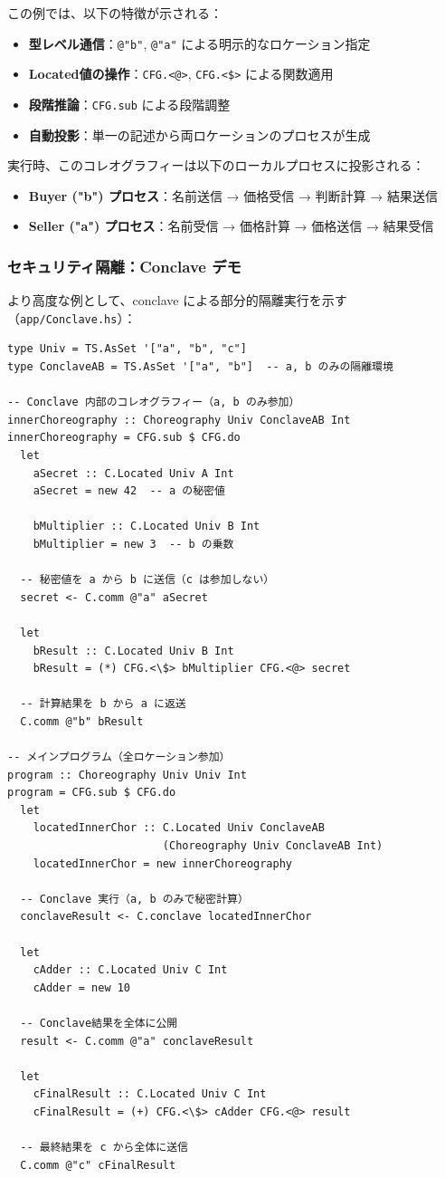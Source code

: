 この例では、以下の特徴が示される：
\begin{itemize}
\item \textbf{型レベル通信}：\texttt{@"b"}, \texttt{@"a"} による明示的なロケーション指定
\item \textbf{Located値の操作}：\texttt{CFG.<@>}, \texttt{CFG.<\$>} による関数適用
\item \textbf{段階推論}：\texttt{CFG.sub} による段階調整
\item \textbf{自動投影}：単一の記述から両ロケーションのプロセスが生成
\end{itemize}

実行時、このコレオグラフィーは以下のローカルプロセスに投影される：
\begin{itemize}
\item \textbf{Buyer ("b") プロセス}：名前送信 → 価格受信 → 判断計算 → 結果送信
\item \textbf{Seller ("a") プロセス}：名前受信 → 価格計算 → 価格送信 → 結果受信
\end{itemize}

\subsubsection{セキュリティ隔離：Conclave デモ}

より高度な例として、conclave による部分的隔離実行を示す（\texttt{app/Conclave.hs}）：

\begin{verbatim}
type Univ = TS.AsSet '["a", "b", "c"]
type ConclaveAB = TS.AsSet '["a", "b"]  -- a, b のみの隔離環境

-- Conclave 内部のコレオグラフィー（a, b のみ参加）
innerChoreography :: Choreography Univ ConclaveAB Int
innerChoreography = CFG.sub $ CFG.do
  let
    aSecret :: C.Located Univ A Int
    aSecret = new 42  -- a の秘密値

    bMultiplier :: C.Located Univ B Int
    bMultiplier = new 3  -- b の乗数

  -- 秘密値を a から b に送信（c は参加しない）
  secret <- C.comm @"a" aSecret

  let
    bResult :: C.Located Univ B Int
    bResult = (*) CFG.<\$> bMultiplier CFG.<@> secret

  -- 計算結果を b から a に返送
  C.comm @"b" bResult

-- メインプログラム（全ロケーション参加）
program :: Choreography Univ Univ Int
program = CFG.sub $ CFG.do
  let
    locatedInnerChor :: C.Located Univ ConclaveAB
                        (Choreography Univ ConclaveAB Int)
    locatedInnerChor = new innerChoreography

  -- Conclave 実行（a, b のみで秘密計算）
  conclaveResult <- C.conclave locatedInnerChor

  let
    cAdder :: C.Located Univ C Int
    cAdder = new 10

  -- Conclave結果を全体に公開
  result <- C.comm @"a" conclaveResult

  let
    cFinalResult :: C.Located Univ C Int
    cFinalResult = (+) CFG.<\$> cAdder CFG.<@> result

  -- 最終結果を c から全体に送信
  C.comm @"c" cFinalResult
\end{verbatim}

